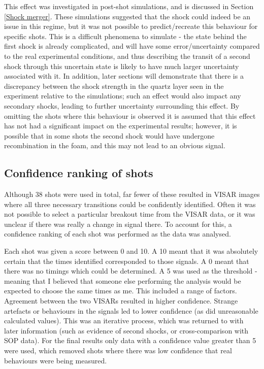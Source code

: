 This effect was investigated in post-shot simulations, and is discussed in Section \ref{Shock merger}. These simulations suggested that the shock could indeed be an issue in this regime, but it was not possible to predict/recreate this behaviour for specific shots. This is a difficult phenomena to simulate - the state behind the first shock is already complicated, and will have some error/uncertainty compared to the real experimental conditions, and thus describing the transit of a second shock through this uncertain state is likely to have much larger uncertainty associated with it. In addition, later sections will demonstrate that there is a discrepancy between the shock strength in the quartz layer seen in the experiment relative to the simulations; such an effect would also impact any secondary shocks, leading to further uncertainty surrounding this effect. By omitting the shots where this behaviour is observed it is assumed that this effect has not had a significant impact on the experimental results; however, it is possible that in some shots the second shock would have undergone recombination in the foam, and this may not lead to an obvious signal.

\subsection{Confidence ranking of shots} \label{Confidence}
Although 38 shots were used in total, far fewer of these resulted in VISAR images where all three necessary transitions could be confidently identified. Often it was not possible to select a particular breakout time from the VISAR data, or it was unclear if there was really a change in signal there. To account for this, a confidence ranking of each shot was performed as the data was analysed.

Each shot was given a score between 0 and 10. A 10 meant that it was absolutely certain that the times identified corresponded to those signals. A 0 meant that there was no timings which could be determined. A 5 was used as the threshold - meaning that I believed that someone else performing the analysis would be expected to choose the same times as me. This included a range of factors. Agreement between the two VISARs resulted in higher confidence. Strange artefacts or behaviours in the signals led to lower confidence (as did unreasonable calculated values). This was an iterative process, which was returned to with later information (such as evidence of second shocks, or cross-comparison with SOP data). For the final results only data with a confidence value greater than 5 were used, which removed shots where there was low confidence that real behaviours were being measured.





